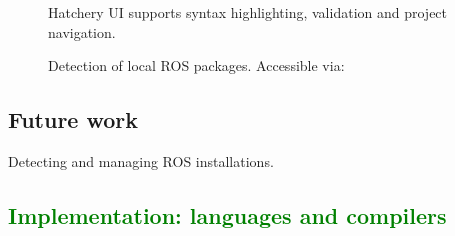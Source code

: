 \documentclass[12pt,initial,twoside,maitrise]{dms}
\newcommand{\welldone}[1]{\textcolor{green}{#1}}
\numberwithin{equation}{section}
\numberwithin{table}{chapter}
\numberwithin{figure}{chapter}
\begin{document}
\begin{figure}[b]
    \centering
    \caption{Hatchery UI supports syntax highlighting, validation and project navigation.}
    \label{fig:hatchery_gui}
\end{figure}

\begin{figure}
    \centering
    \caption{Detection of local ROS packages. Accessible via: }
    \label{fig:ros_settings}
\end{figure}

\section{Future work}

Detecting and managing ROS installations.

\welldone{\chapter{Implementation: languages and compilers}\label{ch:kotlingrad}}
\end{document}
